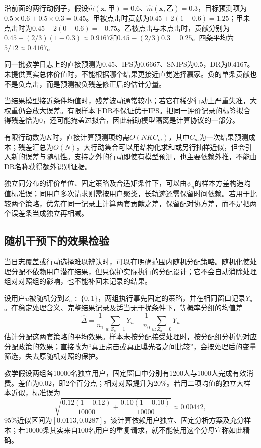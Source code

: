 沿前面的两行动例子，假设$\widehat m(\bm x,\text{甲})=0.6$、$\widehat m(\bm x,\text{乙})=0.3$，目标预测项为$0.5\times0.6+0.5\times0.3=0.45$。甲被点击时贡献为$0.45+2(1-0.6)=1.25$；甲未点击时为$0.45+2(0-0.6)=-0.75$。乙被点击与未点击时，贡献分别为$0.45+(2/3)(1-0.3)\approx0.9167$和$0.45-(2/3)0.3=0.25$。四条平均为$5/12\approx0.4167$。

同一批教学日志上的直接预测为0.45、IPS为0.6667、SNIPS为0.5，DR为0.4167。未提供真实总体价值时，不能根据哪个结果更接近直觉选择赢家。负的单条贡献也不是负点击，而是预测被负残差修正后的估计分量。

当结果模型接近条件均值时，残差波动通常较小；若它在稀少行动上严重失准，大权重仍会放大误差。有限样本下DR不保证优于IPS。把同一评价记录的标签拟合得残差恰为0，还可能掩盖过拟合，因此辅助模型隔离是计算协议的一部分。

有限行动数为$K$时，直接计算预测项约需$O(NK C_m)$，其中$C_m$为一次结果预测成本；残差汇总为$O(N)$。大行动集合可以用结构化求和或另行抽样近似，但会引入新的误差与随机性。支持之外的行动即使有模型预测，也主要依赖外推，不能由DR名称获得额外识别证据。

独立同分布的评价单位、固定策略及合适矩条件下，可以由$\psi_n$的样本方差构造均值标准误；同用户多次请求则需按用户聚类，长轨迹还需保留时间依赖。若用于比较两个策略，优先在同一记录上计算两套贡献之差，保留配对协方差，而不是把两个误差条当成独立再相减。

\subsection{随机干预下的效果检验}
\label{sec:rs-evaluation-randomized}

当日志覆盖或行动选择难以辨认时，可以在明确范围内随机分配策略。随机化使处理分配不依赖用户潜在结果，但只保护实际执行的分配设计；它不会自动消除处理组对对照组的影响，也不能补回未记录的结果。

设用户$u$被随机分到$Z_u\in\{0,1\}$，两组执行事先固定的策略，并在相同窗口记录$Y_u$。在稳定处理含义、完整结果记录及适当无干扰条件下，等概率分组的均值差
\begin{equation}
  \widehat\Delta
    =\frac1{n_1}\sum_{u:Z_u=1}Y_u
      -\frac1{n_0}\sum_{u:Z_u=0}Y_u
  \label{eq:rs-evaluation-experiment}
\end{equation}
估计分配这两套策略的平均效果。样本未按分配接受处理时，按分配组分析仍对应分配政策的效果；直接改为“真正点击或真正曝光者之间比较”，会按处理后的变量筛选，失去原随机对照的保护。

教学假设两组各10000名独立用户，固定窗口中分别有1200人与1000人完成有效消费。差值为0.02，即2个百分点；相对对照提升为20\%。若用二项均值的独立大样本近似，标准误为
\[
  \sqrt{\frac{0.12(1-0.12)}{10000}
             +\frac{0.10(1-0.10)}{10000}}
    \approx0.00442,
\]
95\%近似区间为$[0.0113,0.0287]$。该计算依赖用户独立、固定分析方案及充分样本；若10000条其实来自100名用户的重复请求，就不能使用这个分母宣称如此精确。

